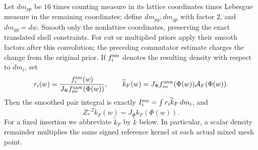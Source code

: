 \begin{lemma}
Let $dm_{pp}$ be $16$ times counting measure in its lattice
coordinates times Lebesgue measure in the remaining coordinates;
define $dm_{pg},dm_{gp}$ with factor $2$, and $dm_{gg}=dw$.
Smooth only the nonlattice coordinates, preserving the exact
translated shell constraints. For cut or multiplied priors apply
their smooth factors after this convolution; the preceding
commutator estimate charges the change from the original prior.
If $f_i^{\rm sm}$ denotes the resulting density with respect to $dm_i$, set
\[
 r_i(w)=\frac{f_i^{\rm sm}(w)}{J_\Phi f_{oo}^{\rm unw}(\Phi(w))},\qquad
 \widetilde k_F(w)=J_\Phi f_{oo}^{\rm unw}(\Phi(w))
                         \mathcal A_F(\Phi(w)).
\]
Then the smoothed pair integral is exactly
$I_i^{\rm sm}=\int r_i\widetilde k_F\,dm_i$, and
\[
 Z_*^{-2}\widetilde k_F(w)=J_\Phi k_F(\Phi(w)).
\]
For a fixed insertion we abbreviate \(\widetilde k_F\) by
\(\widetilde k\) below.
In particular, a scalar density remainder multiplies the same
signed reference kernel at each actual mixed mesh point.
\end{lemma}


